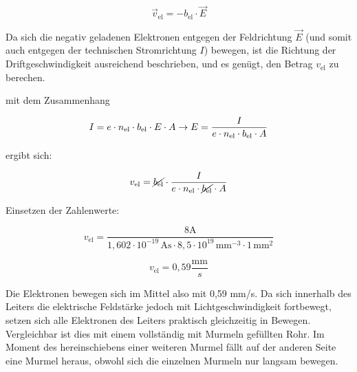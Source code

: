 {\begin{bsp}{}{}
	\begin{equation*}
		\vec{v}_\mathrm{el} = - b_\mathrm{el} \cdot \vec{E}
	\end{equation*}

	Da sich die negativ geladenen Elektronen entgegen der Feldrichtung $\vec{E}$ (und somit auch entgegen der
	 technischen Stromrichtung $I$) bewegen, ist die Richtung der Driftgeschwindigkeit ausreichend beschrieben,
	 und es genügt, den Betrag $v_\mathrm{el}$ zu berechen.


	mit dem Zusammenhang

	\begin{equation*}
	 I = e \cdot n_\mathrm{el} \cdot b_\mathrm{el} \cdot E  \cdot A\\
\rightarrow E = \frac{I}{e \cdot n_\mathrm{el} \cdot b_\mathrm{el} \cdot A}
	\end{equation*}

	

	ergibt sich:

\begin{equation*}
	v_\mathrm{el} = \cancel{b_\mathrm{el}} \cdot \frac{I}{e \cdot n_\mathrm{el} \cdot \cancel{b_\mathrm{el}} \cdot A}
\end{equation*}	

Einsetzen der Zahlenwerte:

\begin{equation*}
	v_\mathrm{el} = \frac{8 \mathrm{A}}{1,602 \cdot 10^{-19} \, \mathrm{As} \cdot 8,5 \cdot 10^{19} \, \mathrm{mm}^{-3} \cdot 1 \, \mathrm{mm}^2 }
\end{equation*}	


\begin{equation*}
	v_\mathrm{el} = 0,59 \frac{\mathrm{mm}}{s} 
\end{equation*}	

Die Elektronen bewegen sich im Mittel also mit 0,59 mm/s. Da sich innerhalb des Leiters die elektrische Feldstärke
jedoch mit Lichtgeschwindigkeit fortbewegt, setzen sich alle Elektronen des Leiters praktisch gleichzeitig in Bewegen.
Vergleichbar ist dies mit einem vollständig mit Murmeln gefüllten Rohr. Im Moment des hereinschiebens einer weiteren 
Murmel fällt auf der anderen Seite eine Murmel heraus, obwohl sich die einzelnen Murmeln nur langsam bewegen. 






\end{bsp}

}


\newpage









